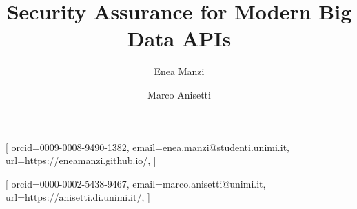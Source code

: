 \documentclass[
]{ceurart}
\begin{document}



\title{Security Assurance for Modern Big Data APIs}


\author[1]{Enea Manzi}[%
  orcid=0009-0008-9490-1382,
  email=enea.manzi@studenti.unimi.it,
  url=https://eneamanzi.github.io/,
]
\cormark[1]

\author[1,2]{Marco Anisetti}[%
  orcid=0000-0002-5438-9467,
  email=marco.anisetti@unimi.it,
  url=https://anisetti.di.unimi.it/,
]
\end{document}
